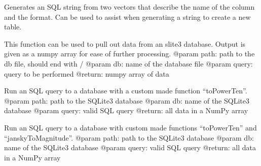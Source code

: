 \documentclass[letterpaper,10pt,english]{sphinxmanual}
\begin{document}

\begin{fulllineitems}
\label{SamPy.db:SamPy.db.sqlite.generateSQLString}
Generates an SQL string from two vectors that
describe the name of the column and the format.
Can be used to assist when generating a string
to create a new table.

\end{fulllineitems}



\begin{fulllineitems}
\label{SamPy.db:SamPy.db.sqlite.get_data_sqlite}
This function can be used to pull out data
from an slite3 database. Output is given as
a numpy array for ease of further processing.
@param path: path to the db file, should end with /
@param db: name of the database file
@param query: query to be performed
@return: numpy array of data

\end{fulllineitems}



\begin{fulllineitems}
\label{SamPy.db:SamPy.db.sqlite.get_data_sqlitePowerTen}
Run an SQL query to a database with a custom
made function ``toPowerTen''.
@param path: path to the SQLite3 database
@param db: name of the SQLite3 database
@param query: valid SQL query
@return: all data in a NumPy array

\end{fulllineitems}



\begin{fulllineitems}
\label{SamPy.db:SamPy.db.sqlite.get_data_sqliteSMNfunctions}
Run an SQL query to a database with custom
made functions ``toPowerTen'' and ``janskyToMagnitude''.
@param path: path to the SQLite3 database
@param db: name of the SQLite3 database
@param query: valid SQL query
@return: all data in a NumPy array

\end{fulllineitems}
\end{document}
